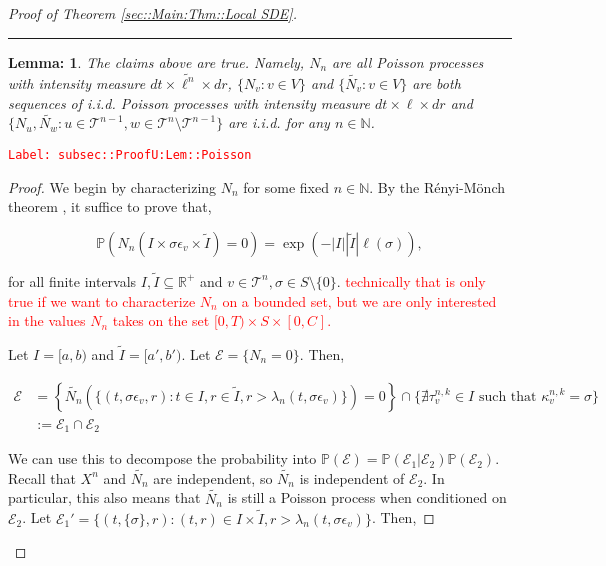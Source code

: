 \documentclass[12pt]{article}
\newcommand{\mb}{\mathbb}
\newcommand{\mc}{\mathcal}
\newcommand{\te}{\text}
\newcommand{\ep}{\epsilon}
\newcommand{\tr}{\textcolor{red}}
\newcommand{\labe}[1]{\tr{\texttt{Label: #1}}}
\newcommand{\lin}{\rule{\linewidth}{0.4 pt}}
\newcommand{\pr}{\mb{P}}							%
\newcommand{\defeq}{:=}								%
\renewcommand{\v}{v}							%
\newcommand{\vv}{u}								%
\newcommand{\vvv}{w}							%
\renewcommand{\S}{S}							%
\newcommand{\s}{\sigma}							%
\newcommand{\ev}[1]{\ep_{#1}}					%
\newcommand{\T}{T}								%
\renewcommand{\t}{t}							%
\newcommand{\poiss}[1]{N_{#1}}						%
\newcommand{\pup}[1]{^{#1}}							%
\newcommand{\tree}{\mc{T}}							%
\newcommand{\V}{V}									%
\renewcommand{\r}{r}								%
\newcommand{\rt}[1]{\tau^{#1}}						%
\renewcommand{\it}{k}								%
\newcommand{\numb}{n}								%
\newcommand{\rxvtsn}[3]{X_{#1}^{#3}{#2}}			%
\newcommand{\rate}[1]{\lambda_{#1}}					%
\newcommand{\const}[1]{C_{#1}}						%
\newcommand{\Sm}{\ell}								%
\newcommand{\alt}{\widetilde}						%
\newcommand{\evnt}{\mc{E}}						%
\renewcommand{\mark}[1]{\kappa^{#1}}				%
\newcommand{\inte}{I}							%
\newtheorem{lem}[thms]{Lemma: }
\begin{document}
\begin{proof}[Proof of Theorem \ref{sec::Main:Thm::Local SDE}]
\lin

\begin{lem}
The claims above are true. Namely, \(\poiss{\numb}\) are all Poisson processes with intensity measure \(d\t\times\alt{\Sm^{\numb}}\times d\r\), \(\{\poiss{\v}:\v\in\V\}\) and \(\{\alt{\poiss{\v}}:\v\in\V\}\) are both sequences of i.i.d. Poisson processes with intensity measure \(d\t\times\Sm\times d\r\) and \(\{\poiss{\vv},\alt{\poiss{\vvv}}:\vv\in \tree\pup{\numb-1},\vvv\in\tree\pup{\numb}\setminus\tree\pup{\numb-1}\}\) are i.i.d. for any \(\numb \in \mb{N}\).

\label{subsec::ProofU:Lem::Poisson}
\end{lem}
\labe{subsec::ProofU:Lem::Poisson}
\begin{proof}

We begin by characterizing \(\poiss{\numb}\) for some fixed \(\numb\in \mb{N}\). By the R\'enyi-M\"onch theorem \cite[Theorem 9.2.XII]{DalVer08}, it suffice to prove that,

\[\pr\left(\poiss{\numb}(\inte\times \s\ev{\v}\times \alt{\inte}) = 0\right) = \exp\left(-|\inte||\alt{\inte}|\Sm(\s)\right),\]

for all finite intervals \(\inte,\alt{\inte}\subseteq \mb{R}^+\) and \(\v\in \tree\pup{\numb},\s\in \S\setminus\{0\}.\) \tr{technically that is only true if we want to characterize \(\poiss{\numb}\) on a bounded set, but we are only interested in the values \(\poiss{\numb}\) takes on the set \([0,\T)\times \S\times [0,\const{}]\).}

Let \(\inte = [a,b)\) and \(\alt{\inte} = [a',b')\). Let \(\evnt = \{\poiss{\numb} =0\}\). Then,

\begin{align*}
\evnt &= \left\{\alt{\poiss{\numb}}\left(\{(\t,\s\ev{\v},\r):\t\in \inte,\r\in \alt{\inte}, \r > \rate{\numb}(\t,\s\ev{\v})\}\right) =0 \right\} \cap \{\nexists \rt{\numb,\it}_{\v} \in \inte \te{ such that } \mark{\numb,\it}_\v = \s\}\\
&\defeq \evnt_1 \cap \evnt_2
\end{align*}

We can use this to decompose the probability into \(\pr(\evnt) = \pr(\evnt_1|\evnt_2)\pr(\evnt_2)\). Recall that \(\rxvtsn{}{}{\numb}\) and \(\alt{\poiss{\numb}}\) are independent, so \(\alt{\poiss{\numb}}\) is independent of \(\evnt_2\). In particular, this also means that \(\alt{\poiss{\numb}}\) is still a Poisson process when conditioned on \(\evnt_2\). Let \(\evnt_1' = \{(\t,\{\s\},\r): (\t,\r) \in \inte\times\alt{\inte},\r> \rate{\numb}(\t,\s\ev{\v})\}\). Then,


\end{proof}
\end{proof}
\end{document}
